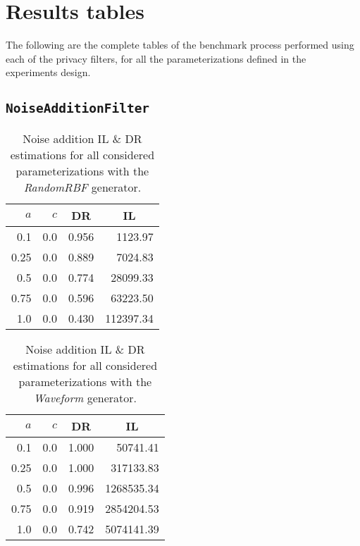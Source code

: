 
\chapter{Results tables} %
\label{AppendixA} %

The following are the complete tables of the benchmark process performed using each of the privacy filters, for all the parameterizations defined in the experiments design.

\section*{\texttt{NoiseAdditionFilter}}

\begin{table}[H]
	\centering
	\begin{tabular}{@{}rrrr@{}}
		\toprule
		$a$ & $c$ & \multicolumn{1}{c}{DR} & \multicolumn{1}{c}{IL} \\ \midrule
		0.1 & 0.0 & 0.956	& 1123.97 \\
		0.25 & 0.0 & 0.889 & 7024.83 \\
		0.5 & 0.0 & 0.774	& 28099.33 \\
		0.75 & 0.0 & 0.596 & 63223.50 \\
		1.0 & 0.0 & 0.430 & 112397.34 \\ \bottomrule
	\end{tabular}
	\caption[Noise addition DR \& IL estimations (RandomRBF).]{Noise addition IL \& DR estimations for all considered parameterizations with the \textit{RandomRBF} generator.}
\end{table}

\begin{table}[H]
	\centering
	\begin{tabular}{@{}rrrr@{}}
		\toprule
		$a$ & $c$ & \multicolumn{1}{c}{DR} & \multicolumn{1}{c}{IL} \\ \midrule
		0.1  & 0.0 & 1.000 & 50741.41   \\
		0.25 & 0.0 & 1.000 & 317133.83  \\
		0.5  & 0.0 & 0.996 & 1268535.34 \\
		0.75 & 0.0 & 0.919 & 2854204.53 \\
		1.0  & 0.0 & 0.742 & 5074141.39 \\ \bottomrule
	\end{tabular}
	\caption[Noise addition DR \& IL estimations (Waveform).]{Noise addition IL \& DR estimations for all considered parameterizations with the \textit{Waveform} generator.}
\end{table}

